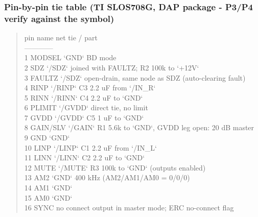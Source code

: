 \documentclass[11pt]{article}
\begin{document}
\subsubsection*{Pin-by-pin tie table (TI SLOS708G, DAP package - P3/P4 verify against the symbol)}
\begin{quote}\small\ttfamily\raggedright
\textbar{} pin \textbar{} name \textbar{} net \textbar{} tie / part \textbar{}\\
\textbar{}---\textbar{}---\textbar{}---\textbar{}---\textbar{}\\
\textbar{} 1 \textbar{} MODSEL \textbar{} `GND` \textbar{} BD mode \textbar{}\\
\textbar{} 2 \textbar{} SDZ \textbar{} `/SDZ` \textbar{} joined with FAULTZ; R2 100k to `+12V` \textbar{}\\
\textbar{} 3 \textbar{} FAULTZ \textbar{} `/SDZ` \textbar{} open-drain, same node as SDZ (auto-clearing fault) \textbar{}\\
\textbar{} 4 \textbar{} RINP \textbar{} `/RINP` \textbar{} C3 2.2 uF from `/IN\_R` \textbar{}\\
\textbar{} 5 \textbar{} RINN \textbar{} `/RINN` \textbar{} C4 2.2 uF to `GND` \textbar{}\\
\textbar{} 6 \textbar{} PLIMIT \textbar{} `/GVDD` \textbar{} direct tie, no limit \textbar{}\\
\textbar{} 7 \textbar{} GVDD \textbar{} `/GVDD` \textbar{} C5 1 uF to `GND` \textbar{}\\
\textbar{} 8 \textbar{} GAIN/SLV \textbar{} `/GAIN` \textbar{} R1 5.6k to `GND`, GVDD leg open: 20 dB master \textbar{}\\
\textbar{} 9 \textbar{} GND \textbar{} `GND` \textbar{} \textbar{}\\
\textbar{} 10 \textbar{} LINP \textbar{} `/LINP` \textbar{} C1 2.2 uF from `/IN\_L` \textbar{}\\
\textbar{} 11 \textbar{} LINN \textbar{} `/LINN` \textbar{} C2 2.2 uF to `GND` \textbar{}\\
\textbar{} 12 \textbar{} MUTE \textbar{} `/MUTE` \textbar{} R3 100k to `GND` (outputs enabled) \textbar{}\\
\textbar{} 13 \textbar{} AM2 \textbar{} `GND` \textbar{} 400 kHz (AM2/AM1/AM0 = 0/0/0) \textbar{}\\
\textbar{} 14 \textbar{} AM1 \textbar{} `GND` \textbar{} \textbar{}\\
\textbar{} 15 \textbar{} AM0 \textbar{} `GND` \textbar{} \textbar{}\\
\textbar{} 16 \textbar{} SYNC \textbar{} no connect \textbar{} output in master mode; ERC no-connect flag \textbar{}\\

\end{quote}
\end{document}
